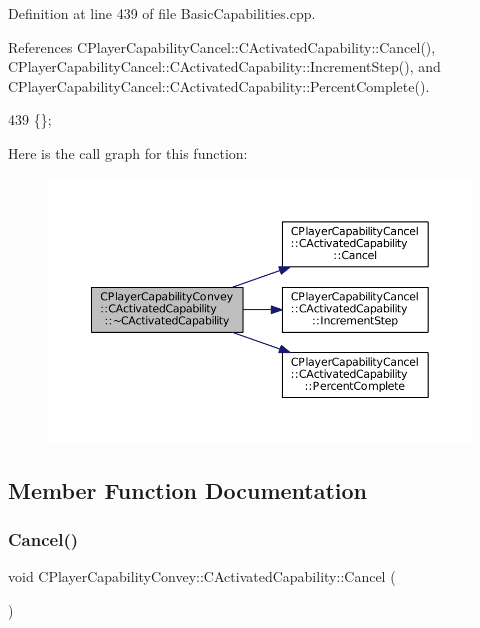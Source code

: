 Definition at line 439 of file Basic\+Capabilities.\+cpp.



References C\+Player\+Capability\+Cancel\+::\+C\+Activated\+Capability\+::\+Cancel(), C\+Player\+Capability\+Cancel\+::\+C\+Activated\+Capability\+::\+Increment\+Step(), and C\+Player\+Capability\+Cancel\+::\+C\+Activated\+Capability\+::\+Percent\+Complete().


\begin{DoxyCode}
439 \{\};
\end{DoxyCode}
Here is the call graph for this function\+:\nopagebreak
\begin{figure}[H]
\begin{center}
\leavevmode
\includegraphics[width=350pt]{classCPlayerCapabilityConvey_1_1CActivatedCapability_a10c78ea328de946070399c5596915641_cgraph}
\end{center}
\end{figure}


\subsection{Member Function Documentation}
\hypertarget{classCPlayerCapabilityConvey_1_1CActivatedCapability_ad84a94a1ae3647ea160e262a0154e229}{}\label{classCPlayerCapabilityConvey_1_1CActivatedCapability_ad84a94a1ae3647ea160e262a0154e229} 
\subsubsection{\texorpdfstring{Cancel()}{Cancel()}}
{\footnotesize\ttfamily void C\+Player\+Capability\+Convey\+::\+C\+Activated\+Capability\+::\+Cancel (\begin{DoxyParamCaption}{ }\end{DoxyParamCaption})\hspace{0.3cm}{\ttfamily [virtual]}}



